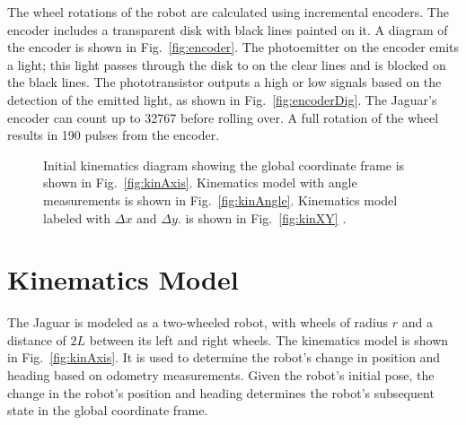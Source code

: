 \documentclass[conference]{../IEEEtran}
\begin{document}
The wheel rotations of the robot are calculated using incremental encoders. The encoder includes a transparent disk with black lines painted on it. A diagram of the encoder is shown in Fig.~\ref{fig:encoder}. The photoemitter on the encoder emits a light; this light passes through the disk to on the clear lines and is blocked on the black lines. The phototransistor outputs a high or low signals based on the detection of the emitted
light, as shown in Fig.~\ref{fig:encoderDig}.
The Jaguar's encoder can count up to 32767 before rolling over. A full rotation
of the wheel results in 190 pulses from the encoder.

\begin{figure}[t]
  \centering
   \hspace{1.5cm}
  \caption{Initial kinematics diagram showing the global coordinate frame is shown in
           Fig.~\ref{fig:kinAxis}. Kinematics model with angle measurements is shown in
           Fig.~\ref{fig:kinAngle}. Kinematics model labeled with $\Delta x$ and $\Delta y$.
           is shown in Fig.~\ref{fig:kinXY} \cite{lecture}.}
\end{figure}

\section{Kinematics Model}
The Jaguar is modeled as a two-wheeled robot,
with wheels of radius $r$ and a distance of $2L$ between its left and right wheels. The kinematics model is shown in Fig.~\ref{fig:kinAxis}. It is used to determine the robot's change in position and heading based on odometry measurements. Given the robot's initial pose, the change in the robot's position and heading determines the robot's subsequent state in the global coordinate frame.
\end{document}
